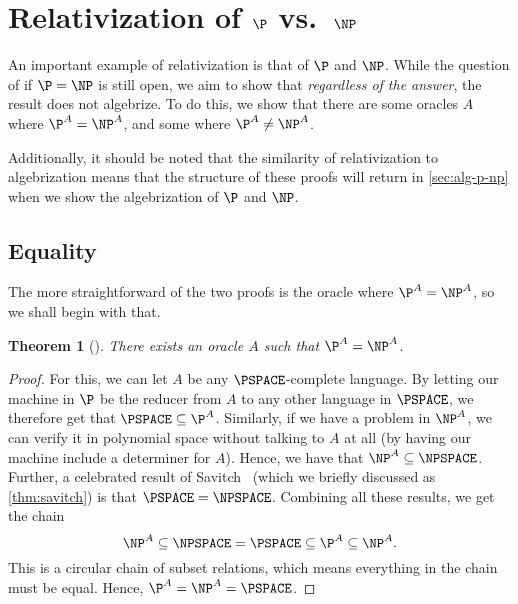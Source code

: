 \documentclass[english,12pt]{reedthesis}
\theoremstyle{plain}
\newtheorem{thm}{Theorem}[section]
\theoremstyle{definition}
\theoremstyle{remark}
\begin{document}
\section{Relativization of $\P$ vs.\ $\NP$}\label{sec:rel-p-np}

An important example of relativization is that of $\P$ and $\NP$. While the
question of if $\P = \NP$ is still open, we aim to show that \emph{regardless of
the answer}, the result does not algebrize. To do this, we show that there are
some oracles $A$ where $\P^{A} = \NP^{A}$, and some where $\P^{A} \ne \NP^{A}$.

Additionally, it should be noted that the similarity of relativization to
algebrization means that the structure of these proofs will return in
\cref{sec:alg-p-np} when we show the algebrization of $\P$ and $\NP$.

\subsection{Equality}

The more straightforward of the two proofs is the oracle where
$\P^{A} = \NP^{A}$, so we shall begin with that.

\begin{thm}[{\cite[Theorem 2]{BGS75}}]\label{thm:p-np-rel}
  There exists an oracle $A$ such that $\P^{A} = \NP^{A}$.
\end{thm}

\begin{proof}
  For this, we can let $A$ be any $\PSPACE$-complete language. By letting our
  machine in $\P$ be the reducer from $A$ to any other language in $\PSPACE$, we
  therefore get that $\PSPACE \subseteq \P^{A}$. Similarly, if we have a problem in
  $\NP^{A}$, we can verify it in polynomial space without talking to $A$ at all
  (by having our machine include a determiner for $A$). Hence, we have that
  $\NP^{A} \subseteq \NPSPACE$. Further, a celebrated result of Savitch~\cite{Sav70}
  (which we briefly discussed as \cref{thm:savitch}) is that
  $\PSPACE = \NPSPACE$. Combining all these results, we get the chain
  \begin{equation}
    \NP^{A} \subseteq \NPSPACE = \PSPACE \subseteq \P^{A} \subseteq \NP^{A}.
  \end{equation}
  This is a circular chain of subset relations, which means everything in the
  chain must be equal. Hence, $\P^{A} = \NP^{A} = \PSPACE$.
\end{proof}
\end{document}
